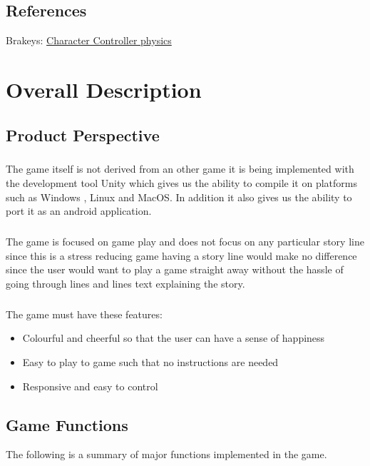 \section{References}
 Brakeys: \href{https://github.com/Brackeys/2D-Character-Controller}{Character Controller physics}


\chapter{Overall Description}
\label{Overall Description}

\section{Product Perspective}
\paragraph{}The game itself is not derived from an other game it is being implemented with the development tool Unity which gives us the ability to compile it on platforms such as Windows , Linux and MacOS. In addition it also gives us the ability to port it as an android application.

\paragraph{}The game is focused on game play and does not focus on any particular story line since this is a stress reducing game having a story line would make no difference since the user would want to play a game straight away without the hassle of going through lines and lines text explaining the story.

\paragraph{} The game must have these features:
\begin{itemize}
    \item Colourful and cheerful so that the user can have a sense of happiness 
    \item Easy to play to game such that no instructions are needed 
    \item Responsive and easy to control  
\end{itemize}
\section{Game Functions}
The following is a summary of major functions implemented in the game.
